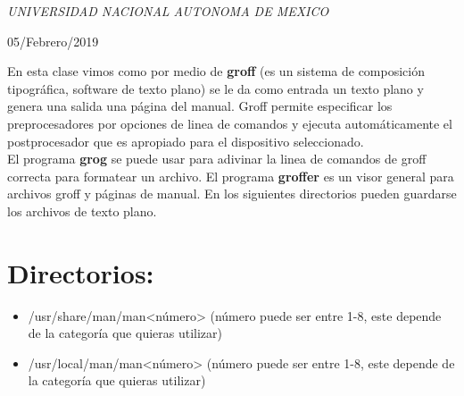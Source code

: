 \documentclass[a4paper, 11pt, oneside]{article}
\begin{document}
\begin{titlepage}
	\textit{UNIVERSIDAD NACIONAL AUTONOMA DE MEXICO} 
	
	\vfill
	
	
	
	
	\vspace{0.3\baselineskip} 
	
	05/Febrero/2019 
	
	 

\end{titlepage}

En esta clase vimos como por medio de \textbf{groff} (es un sistema de composición tipográfica, software de texto plano) se le da como entrada un texto plano y genera una salida una página del manual. Groff permite especificar los preprocesadores por opciones de linea de comandos y ejecuta automáticamente el postprocesador que es apropiado para el dispositivo seleccionado.\\
El programa \textbf{grog} se puede usar para adivinar la linea de comandos de groff correcta para formatear un archivo. El programa \textbf{groffer} es un visor general para archivos groff y páginas de manual. En los siguientes directorios pueden guardarse los archivos de texto plano.
\section*{Directorios:}
\begin{itemize}
 \item /usr/share/man/man<número> (número puede ser entre 1-8, este depende de la categoría que quieras utilizar)
 \item /usr/local/man/man<número> (número puede ser entre 1-8, este depende de la categoría que quieras utilizar)
\end{itemize}
\end{document}
